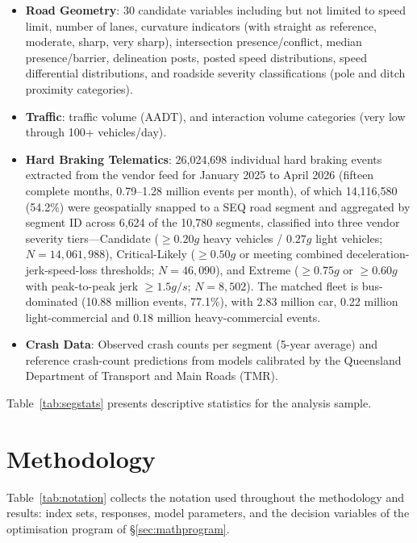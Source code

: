 \documentclass[letterpaper,8pt]{extarticle}  %
\begin{document}
\begin{doublespacing}
\begin{linenumbers}
\begin{itemize}
    \item \textbf{Road Geometry}: 30 candidate variables including but not limited to speed limit, number of lanes, curvature indicators (with straight as reference, moderate, sharp, very sharp), intersection presence/conflict, median presence/barrier, delineation posts, posted speed distributions, speed differential distributions, and roadside severity classifications (pole and ditch proximity categories).
    \item \textbf{Traffic}: traffic volume (AADT), and interaction volume categories (very low through 100+ vehicles/day).
    \item \textbf{Hard Braking Telematics}: 26{,}024{,}698 individual hard braking events extracted from the vendor feed for January 2025 to April 2026 (fifteen complete months, 0.79--1.28 million events per month), of which 14{,}116{,}580 (54.2\%) were geospatially snapped to a SEQ road segment and aggregated by segment ID across 6{,}624 of the 10{,}780 segments, classified into three vendor severity tiers---Candidate ($\geq 0.20g$ heavy vehicles / $0.27g$ light vehicles; $N=14{,}061{,}988$), Critical-Likely ($\geq 0.50g$ or meeting combined deceleration-jerk-speed-loss thresholds; $N=46{,}090$), and Extreme ($\geq 0.75g$ or $\geq 0.60g$ with peak-to-peak jerk $\geq 1.5g/s$; $N=8{,}502$). The matched fleet is bus-dominated (10.88 million events, 77.1\%), with 2.83 million car, 0.22 million light-commercial and 0.18 million heavy-commercial events.
    \item \textbf{Crash Data}: Observed crash counts per segment (5-year average) and reference crash-count predictions from models calibrated by the Queensland Department of Transport and Main Roads (TMR).
\end{itemize}

Table~\ref{tab:segstats} presents descriptive statistics for the analysis sample.



\FloatBarrier


\section{Methodology}\label{sec:methodology}

Table~\ref{tab:notation} collects the notation used throughout the methodology and results: index sets, responses, model parameters, and the decision variables of the optimisation program of \S\ref{sec:mathprogram}.


\end{linenumbers}
\end{doublespacing}
\end{document}
